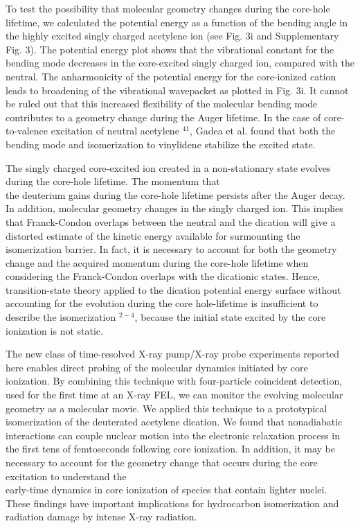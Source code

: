 \documentclass[10pt]{article}
\begin{document}
To test the possibility that molecular geometry changes during the core-hole lifetime, we calculated the potential energy as a function of the bending angle in the highly excited singly charged acetylene ion (see Fig. 3i and Supplementary Fig. 3). The potential energy plot shows that the vibrational constant for the bending mode decreases in the core-excited singly charged ion, compared with the neutral. The anharmonicity of the potential energy for the core-ionized cation leads to broadening of the vibrational wavepacket as plotted in Fig. 3i. It cannot be ruled out that this increased flexibility of the molecular bending mode contributes to a geometry change during the Auger lifetime. In the case of core-to-valence excitation of neutral acetylene ${ }^{41}$, Gadea et al. found that both the bending mode and isomerization to vinylidene stabilize the excited state.

The singly charged core-excited ion created in a non-stationary state evolves during the core-hole lifetime. The momentum that\\
the deuterium gains during the core-hole lifetime persists after the Auger decay. In addition, molecular geometry changes in the singly charged ion. This implies that Franck-Condon overlaps between the neutral and the dication will give a distorted estimate of the kinetic energy available for surmounting the isomerization barrier. In fact, it is necessary to account for both the geometry change and the acquired momentum during the core-hole lifetime when considering the Franck-Condon overlaps with the dicationic states. Hence, transition-state theory applied to the dication potential energy surface without accounting for the evolution during the core hole-lifetime is insufficient to describe the isomerization ${ }^{2-4}$, because the initial state excited by the core ionization is not static.

The new class of time-resolved X-ray pump/X-ray probe experiments reported here enables direct probing of the molecular dynamics initiated by core ionization. By combining this technique with four-particle coincident detection, used for the first time at an X-ray FEL, we can monitor the evolving molecular geometry as a molecular movie. We applied this technique to a prototypical isomerization of the deuterated acetylene dication. We found that nonadiabatic interactions can couple nuclear motion into the electronic relaxation process in the first tens of femtoseconds following core ionization. In addition, it may be necessary to account for the geometry change that occurs during the core excitation to understand the\\
early-time dynamics in core ionization of species that contain lighter nuclei. These findings have important implications for hydrocarbon isomerization and radiation damage by intense X-ray radiation.
\end{document}
